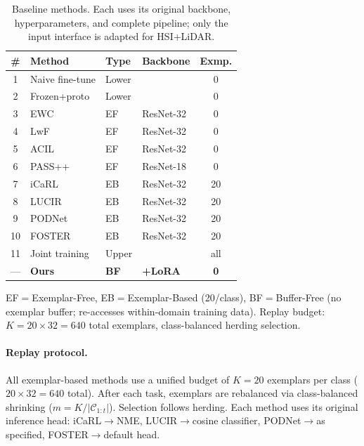 \begin{table}[t]
\centering
\caption{Baseline methods. Each uses its original backbone, hyperparameters, and complete pipeline; only the input interface is adapted for HSI+LiDAR.}
\label{tab:baselines}
\small
\begin{tabular}{clllc}
\toprule
\# & Method & Type & Backbone & Exmp. \\
\midrule
1 & Naive fine-tune & Lower & \backbonename{} & 0 \\
2 & Frozen+proto & Lower & \backbonename{} & 0 \\
3 & EWC~\cite{kirkpatrick2017ewc} & EF & ResNet-32 & 0 \\
4 & LwF~\cite{li2017lwf} & EF & ResNet-32 & 0 \\
5 & ACIL~\cite{zhuang2022acil} & EF & ResNet-32 & 0 \\
6 & PASS++~\cite{zhu2025pass} & EF & ResNet-18 & 0 \\
7 & iCaRL~\cite{rebuffi2017icarl} & EB & ResNet-32 & 20 \\
8 & LUCIR~\cite{hou2019lucir} & EB & ResNet-32 & 20 \\
9 & PODNet~\cite{douillard2020podnet} & EB & ResNet-32 & 20 \\
10 & FOSTER~\cite{wang2022foster} & EB & ResNet-32 & 20 \\
11 & Joint training & Upper & \backbonename{} & all \\
\midrule
--- & \textbf{Ours} & \textbf{BF} & \textbf{\backbonename{}+LoRA} & \textbf{0} \\
\bottomrule
\end{tabular}
\vspace{-1mm}
{\footnotesize EF$=$Exemplar-Free, EB$=$Exemplar-Based (20/class), BF$=$Buffer-Free (no exemplar buffer; re-accesses within-domain training data). Replay budget: $K = 20 \times 32 = 640$ total exemplars, class-balanced herding selection.}
\end{table}

\paragraph{Replay protocol.}
All exemplar-based methods use a unified budget of $K{=}20$ exemplars per class ($20 \times 32 = 640$ total).
After each task, exemplars are rebalanced via class-balanced shrinking ($m = K / |\mathcal{C}_{1:t}|$).
Selection follows herding.
Each method uses its original inference head: iCaRL$\to$NME, LUCIR$\to$cosine classifier, PODNet$\to$as specified, FOSTER$\to$default head.

